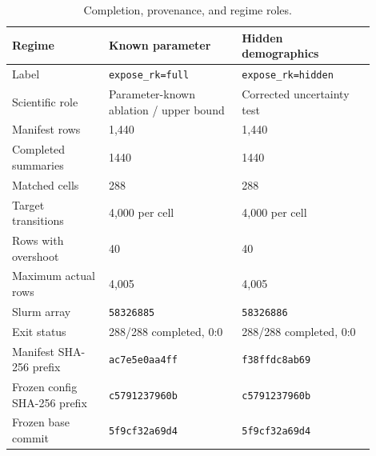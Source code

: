 \begin{table}[htbp]
\centering
\caption{Completion, provenance, and regime roles.}
\label{tab:completion}
\begin{tabular}{p{0.24\linewidth}p{0.33\linewidth}p{0.33\linewidth}}
\toprule
Regime & Known parameter & Hidden demographics \\
\midrule
Label & \texttt{expose\_rk=full} & \texttt{expose\_rk=hidden} \\
Scientific role & Parameter-known ablation / upper bound & Corrected uncertainty test \\
Manifest rows & 1,440 & 1,440 \\
Completed summaries & 1440 & 1440 \\
Matched cells & 288 & 288 \\
Target transitions & 4,000 per cell & 4,000 per cell \\
Rows with overshoot & 40 & 40 \\
Maximum actual rows & 4,005 & 4,005 \\
Slurm array & \texttt{58326885} & \texttt{58326886} \\
Exit status & 288/288 completed, 0:0 & 288/288 completed, 0:0 \\
Manifest SHA-256 prefix & \texttt{ac7e5e0aa4ff} & \texttt{f38ffdc8ab69} \\
Frozen config SHA-256 prefix & \texttt{c5791237960b} & \texttt{c5791237960b} \\
Frozen base commit & \texttt{5f9cf32a69d4} & \texttt{5f9cf32a69d4} \\
\bottomrule
\end{tabular}
\end{table}
